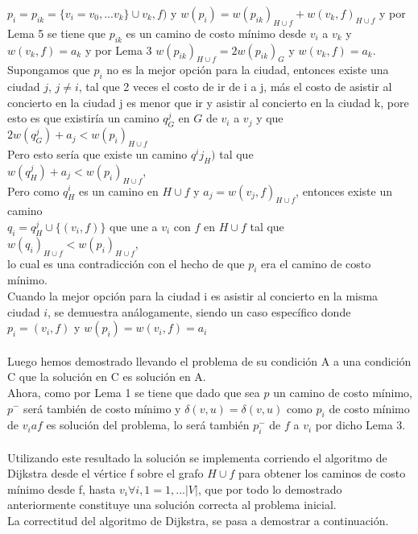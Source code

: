 \documentclass[12pt]{article}
\begin{document}
$p_i = p_{ik} = \{v_i = v_0,...v_k \}\cup{v_k,f)}$ y $w(p_i) = w(p_{ik})_ {H\cup f} + w(v_k,f)_{H\cup f}$  
y por Lema 5 se tiene que $p_{ik}$ es un camino de costo m\'inimo desde $v_i$ a $v_k$ y $w(v_k,f) = a_k$ y por Lema 3 $w(p_{ik})_{H\cup f} = 2w(p_{ik})_G $ y $w(v_k,f) = a_k$.\\

Supongamos que $p_i$ no es la mejor opci\'on para la ciudad, entonces existe una ciudad $j$, $j\neq i$, tal que 2 veces el costo de ir de i a j, m\'as el costo de asistir al concierto
en la ciudad j es menor que ir y asistir al concierto en la ciudad k, pore esto es que existir\'ia un camino
$q^j_G$ en $G$ de $v_i$ a $v_j$ y que\\
 $2w(q^j_G) + a_j < w(p_i)_{H\cup f}$\\
 
 Pero esto ser\'ia que existe un camino $q^ij_H)$ tal que\\
  $w(q^j_H) + a_j < w(p_i)_{H\cup f}$,\\
 
Pero como $q^{i}_{H}$ es un camino en $H\cup f$ y $a_j = w(v_j, f)_{H\cup f}$, entonces existe un camino \\
$q_i = q^j_H\cup \{(v_i,f)\}$ que une a $v_i$ con $f$ en $H\cup f$ tal que \\
$w(q_i)_{H\cup f} < w(p_i)_{H\cup f}$, \\
lo cual es una contradicci\'on con el hecho de que $p_i$ era el camino de
costo m\'inimo.\\

Cuando la mejor opci\'on para la ciudad i es asistir al concierto en la misma ciudad $i$, se demuestra an\'alogamente, siendo un caso espec\'ifico donde
$p_i = (v_i,f)$ y $w(p_i) = w(v_i,f) = a_i$\\
\\
Luego hemos demostrado llevando el problema de su condici\'on A  a una condici\'on C que la soluci\'on en C es soluci\'on en A.\\

Ahora, como por Lema 1 se tiene que dado que sea $p$ un camino de costo m\'inimo, $p^-$ ser\'a tambi\'en de costo m\'inimo y $\delta (v,u) = \delta (v,u)$
como $p_i$  de costo m\'inimo de $v_i a f$ es soluci\'on del problema, lo ser\'a tambi\'en $p^-_i$ de $f$ a $v_i$ por dicho Lema 3.\\
\\
Utilizando este resultado la soluci\'on se implementa corriendo el algoritmo de Dijkstra desde el v\'ertice f sobre el grafo $H\cup f$ para obtener los 
caminos de costo m\'inimo desde f, hasta $v_i \forall i, 1 = 1,... |V|$, que  por todo lo demostrado anteriormente constituye una soluci\'on 
correcta al problema inicial.\\
La correctitud del algoritmo de Dijkstra, se pasa a demostrar a continuaci\'on.\\
\\\
 
\end{document}
